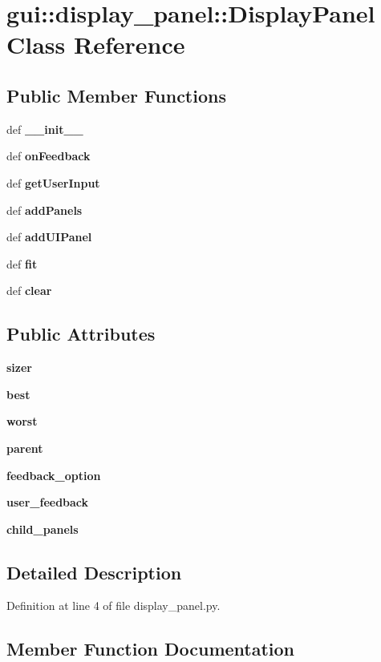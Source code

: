 \section{gui::display\_\-panel::DisplayPanel Class Reference}
\label{classgui_1_1display__panel_1_1DisplayPanel}
\subsection*{Public Member Functions}
\begin{CompactItemize}
\item 
def {\bf \_\-\_\-init\_\-\_\-}
\item 
def {\bf onFeedback}
\item 
def {\bf getUserInput}
\item 
def {\bf addPanels}
\item 
def {\bf addUIPanel}
\item 
def {\bf fit}
\item 
def {\bf clear}
\end{CompactItemize}
\subsection*{Public Attributes}
\begin{CompactItemize}
\item 
{\bf sizer}
\item 
{\bf best}
\item 
{\bf worst}
\item 
{\bf parent}
\item 
{\bf feedback\_\-option}
\item 
{\bf user\_\-feedback}
\item 
{\bf child\_\-panels}
\end{CompactItemize}


\subsection{Detailed Description}


Definition at line 4 of file display\_\-panel.py.

\subsection{Member Function Documentation}
